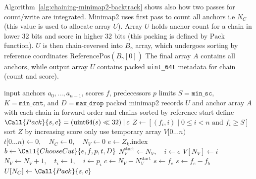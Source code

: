 Algorithm~\ref{alg:chaining-minimap2-backtrack} shows also how two passes for count/write are integrated. Minimap2 uses first pass to count all anchors i.e $N_C$ (this value is used to allocate array $U$). Array $U$ holds anchor count for a chain in lower 32 bits and score in higher 32 bits (this packing is defined by $\text{Pack}$ function).
$U$ is then chain-reversed into $B_\gamma$ array, which undergoes sorting by reference coordinates $\text{ReferencePos}(B_\gamma[0])$
The final array $A$ contains all anchors, while output array $U$ contains packed \texttt{uint\_64t} metadata for chain (count and score).

\begin{algorithm}[H]
\caption{Minimap2 scalar backtracking and final chain order}
\label{alg:chaining-minimap2-backtrack}
\footnotesize
\begin{algorithmic}[1]
  \Require input anchors \(a_0,\ldots,a_{n-1}\), scores \(f\), predecessors \(p\)
  \Require limits \(S=\texttt{min\_sc}\),
           \(K=\texttt{min\_cnt}\), and \(D=\texttt{max\_drop}\)
  \Ensure packed minimap2 records \(U\) and anchor array \(A\) with each chain in forward order and chains sorted by reference start
  \State define
        \(\Call{Pack}{s,c}=(\operatorname{uint64}(s)\ll32)\mathbin{\vert}c\)
  \State \(Z\gets[(f_i,i)\mid 0\leq i<n\text{ and }f_i\geq S]\)
  \State sort \(Z\) by increasing score only
  \State use temporary array \(V[0\ldots n)\)
    \State \(t[0\ldots n)\gets0,\quad N_C\gets0,\quad N_V\gets0\)
      \State \(e\gets Z_k.\mathrm{index}\)
        \State \(b\gets\Call{ChooseCut}{e,f,p,t,D}\)
        \State \(N_V^{\mathrm{start}}\gets N_V,\quad i\gets e\)
            \State \(V[N_V]\gets i\)
          \EndIf
          \State \(N_V\gets N_V+1,\quad t_i\gets1,\quad i\gets p_i\)
        \EndWhile
        \State \(c\gets N_V-N_V^{\mathrm{start}}\)
          \State \(s\gets f_e\)
        \Else
          \State \(s\gets f_e-f_b\)
        \EndIf
            \State \(U[N_C]\gets\Call{Pack}{s,c}\)

\end{algorithmic}
\end{algorithm}
